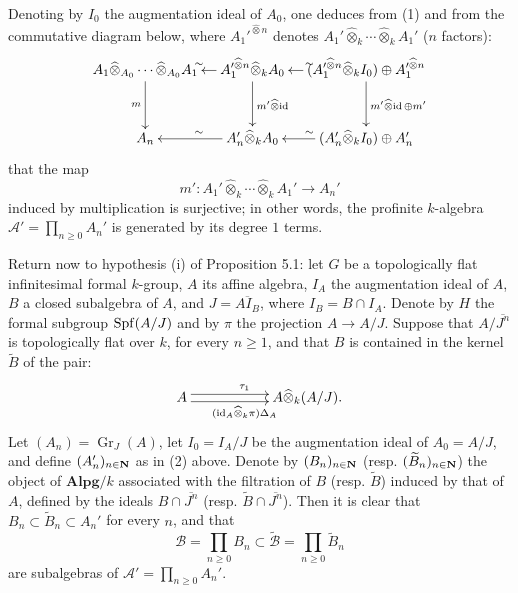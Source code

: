 Denoting by $I_0$ the augmentation ideal of $A_0$, one deduces from (1) and from the commutative diagram below, where $A_1'^{\widehat\otimes n}$ denotes $A_1'\widehat\otimes_k\cdots\widehat\otimes_k A_1'$ ($n$ factors):
\[
\xymatrix@C=10pt@R=30pt{
A_1\widehat\otimes_{A_0}\cdots\widehat\otimes_{A_0}A_1\ar[d]_m&A_1'^{\widehat\otimes n}\widehat\otimes_k A_0\ar[l]_\sim\ar[d]^{m'\widehat\otimes\id}&(A_1'^{\widehat\otimes n}\widehat\otimes_k I_0)\oplus A_1'^{\widehat\otimes n}\ar[l]_\sim\ar[d]^{m'\widehat\otimes\id\,\oplus m'}\\
A_n&A_n'\widehat\otimes_k A_0\ar[l]_\sim&(A_n'\widehat\otimes_k I_0)\oplus A_n'\ar[l]_\sim}
\]
that the map
\[
m':A_1'\widehat\otimes_k\cdots\widehat\otimes_k A_1'\longrightarrow A_n'\tag{3}
\]
induced by multiplication is surjective; in other words, the profinite $k$-algebra $\mathscr A'=\prod_{n\ge0}A_n'$ is generated by its degree $1$ terms.

Return now to hypothesis (i) of Proposition 5.1: let $G$ be a topologically flat infinitesimal formal $k$-group, $A$ its affine algebra, $I_A$ the augmentation ideal of $A$, $B$ a closed subalgebra of $A$, and $J=\overline{AI_B}$, where $I_B=B\cap I_A$. Denote by $H$ the formal subgroup $\operatorname{Spf}(A/J)$ and by $\pi$ the projection $A\to A/J$. Suppose that $A/\overline{J^n}$ is topologically flat over $k$, for every $n\ge1$, and that $B$ is contained in the kernel $\widetilde B$ of the pair:
\[
\xymatrix@C=55pt{A\ar@<.6ex>[r]^{\tau_1}\ar@<-.6ex>[r]_{(\id_A\widehat\otimes_k\pi)\Delta_A}&A\widehat\otimes_k(A/J).}
\]
Let $(A_n)=\operatorname{Gr}_J(A)$, let $I_0=I_A/J$ be the augmentation ideal of $A_0=A/J$, and define $(A_n')_{n\in\mathbf{N}}$ as in (2) above. Denote by $(B_n)_{n\in\mathbf{N}}$ (resp. $(\widetilde B_n)_{n\in\mathbf{N}}$) the object of $\mathbf{Alpg}/k$ associated with the filtration of $B$ (resp. $\widetilde B$) induced by that of $A$, \ie defined by the ideals $B\cap\overline{J^n}$ (resp. $\widetilde B\cap\overline{J^n}$). Then it is clear that $B_n\subset\widetilde B_n\subset A_n'$ for every $n$, and that
\[
\mathscr B=\prod_{n\ge0}B_n\subset\widetilde{\mathscr B}=\prod_{n\ge0}\widetilde B_n
\]
are subalgebras of $\mathscr A'=\prod_{n\ge0}A_n'$.

